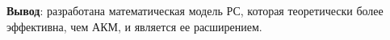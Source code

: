 {\bf Вывод}: разработана математическая модель РС, которая теоретически
более эффективна, чем АКМ, и является ее расширением.




